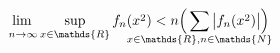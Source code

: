 \documentclass{article}
\begin{document}
\[
  \adjustlimits\lim_{n\to\infty} \sup_{x\in\mathds{R}}
    f_n(\cramped{x^2})
    < n \Big( \smashoperator{\sum_{x\in\mathds{R},
    n\in\mathds{N}}}
    \big\lvert f_n(\cramped{x^2}) \big\rvert \Big)
\]
\end{document}
